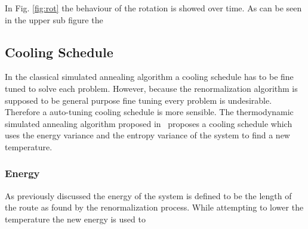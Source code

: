 
In Fig. \ref{fig:rot} the behaviour of the rotation is showed over time. As
can be seen in the upper sub figure the 

\subsection{Cooling Schedule}
In the classical simulated annealing algorithm a cooling schedule has to be
fine tuned to solve each problem. However, because the renormalization
algorithm is supposed to be general purpose fine tuning every problem is
undesirable. Therefore a auto-tuning cooling schedule is more sensible.  The
thermodynamic simulated annealing algorithm proposed in
\cite{devicente2003pts}~proposes a cooling schedule which uses the energy
variance and the entropy variance of the system to find a new temperature. 

\subsubsection{Energy}
As previously discussed the energy of the system is defined to be the length
of the route as found by the renormalization process. While attempting to
lower the temperature the new energy is used to








